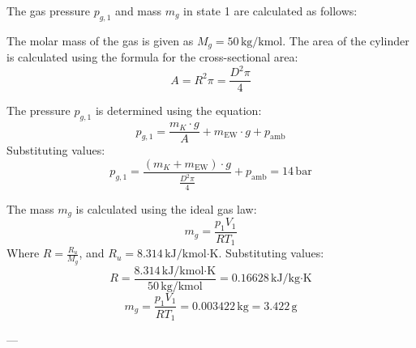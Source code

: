 The gas pressure \( p_{g,1} \) and mass \( m_g \) in state 1 are calculated as follows:  

The molar mass of the gas is given as \( M_g = 50 \, \text{kg/kmol} \). The area of the cylinder is calculated using the formula for the cross-sectional area:  
\[
A = R^2 \pi = \frac{D^2 \pi}{4}
\]  

The pressure \( p_{g,1} \) is determined using the equation:  
\[
p_{g,1} = \frac{m_K \cdot g}{A} + m_{\text{EW}} \cdot g + p_{\text{amb}}
\]  
Substituting values:  
\[
p_{g,1} = \frac{(m_K + m_{\text{EW}}) \cdot g}{\frac{D^2 \pi}{4}} + p_{\text{amb}} = 14 \, \text{bar}
\]  

The mass \( m_g \) is calculated using the ideal gas law:  
\[
m_g = \frac{p_1 V_1}{R T_1}
\]  
Where \( R = \frac{R_u}{M_g} \), and \( R_u = 8.314 \, \text{kJ/kmol·K} \). Substituting values:  
\[
R = \frac{8.314 \, \text{kJ/kmol·K}}{50 \, \text{kg/kmol}} = 0.16628 \, \text{kJ/kg·K}
\]  
\[
m_g = \frac{p_1 V_1}{R T_1} = 0.003422 \, \text{kg} = 3.422 \, \text{g}
\]  

---